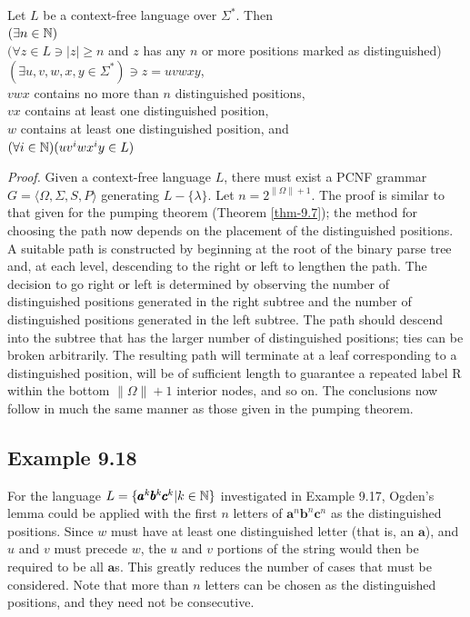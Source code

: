 \begin{thm}\label{thm-9.9}
Let $L$ be a context-free language over $\Sigma^*$. Then \\
$(\exists n\in\mathbb{N})$ \\
$(\forall z \in L \ni |z| \geq n$ and $z$ has any $n$ or more positions marked
as distinguished) \\
$(\exists u,v,w,x,y \in\Sigma^*) \ni z = uvwxy$, \\
$vwx$ contains no more than $n$ distinguished positions, \\
$vx$ contains at least one distinguished position, \\
$w$ contains at least one distinguished position, and \\
$(\forall i \in\mathbb{N})(uv^iwx^iy \in L)$

\emph{Proof.} Given a context-free language $L$, there must exist a PCNF grammar
$G=\langle\Omega,\Sigma,S,P\rangle$ generating $L - \{\lambda\}$. Let $n =
2^{\|\Omega\|+1}$. The proof is similar to that given for the pumping theorem
(Theorem \ref{thm-9.7}); the method for choosing the path now depends on the placement of
the distinguished positions. A suitable path is constructed by beginning at the
root of the binary parse tree and, at each level, descending to the right or
left to lengthen the path. The decision to go right or left is determined by
observing the number of distinguished positions generated in the right subtree
and the number of distinguished positions generated in the left subtree. The
path should descend into the subtree that has the larger number of distinguished
positions; ties can be broken arbitrarily. The resulting path will terminate at
a leaf corresponding to a distinguished position, will be of sufficient length
to guarantee a repeated label R within the bottom $\|\Omega\| + 1$ interior
nodes, and so on. The conclusions now follow in much the same manner as those
given in the pumping theorem.
\end{thm}

\subsection*{Example 9.18}

For the language $L=\{\pmb{a}^k\pmb{b}^k\pmb{c}^k|k \in\mathbb{N}\}$ investigated in
Example 9.17, Ogden's lemma could be applied with the first $n$ letters of
$\pmb{a}^n\pmb{b}^n\pmb{c}^n$ as the distinguished positions. Since $w$ must
have at least one distinguished letter (that is, an $\pmb{a}$), and $u$ and $v$
must precede $w$, the $u$ and $v$ portions of the string would then be required
to be all $\pmb{a}$s. This greatly reduces the number of cases that must be
considered. Note that more than $n$ letters can be chosen as the distinguished
positions, and they need not be consecutive.


